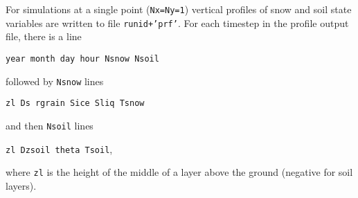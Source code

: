 \documentclass{article}
\begin{document}
For simulations at a single point ({\tt Nx=Ny=1}) vertical profiles of snow and soil state variables are written to file {\tt runid+'prf'}. For each timestep in the profile output file, there is a line

\hskip20pt{\tt year month day hour Nsnow Nsoil}

followed by {\tt Nsnow} lines

\hskip20pt{\tt zl Ds rgrain Sice Sliq Tsnow}

and then {\tt Nsoil} lines

\hskip20pt{\tt zl Dzsoil theta Tsoil},

where {\tt zl} is the height of the middle of a layer above the ground (negative for soil layers).
\end{document}
